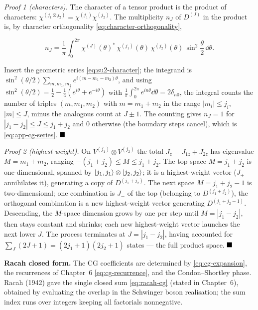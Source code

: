\medskip\noindent\textit{Proof 1 (characters).} The character of a tensor product is the product of characters: $\chi^{(j_{1}\otimes j_{2})}=\chi^{(j_{1})}\chi^{(j_{2})}$. The multiplicity $n_{J}$ of $D^{(J)}$ in the product is, by character orthogonality \eqref{eq:character-orthogonality},
\begin{linenomath}
\begin{equation*}
n_{J}=\frac1\pi\int_{0}^{2\pi}\chi^{(J)}(\theta)^{*}\,\chi^{(j_{1})}(\theta)\,\chi^{(j_{2})}(\theta)\,\sin^{2}\!\frac{\theta}{2}\,\dd\theta.
\end{equation*}
\end{linenomath}
Insert the geometric series \eqref{eq:su2-character}; the integrand is $\sin^{2}(\theta/2)\sum_{m,m_{1},m_{2}}e^{i(m-m_{1}-m_{2})\theta}$, and using $\sin^{2}(\theta/2)=\tfrac12-\tfrac14(e^{i\theta}+e^{-i\theta})$ with $\frac1\pi\int_{0}^{2\pi}e^{in\theta}\dd\theta=2\delta_{n0}$, the integral counts the number of triples $(m,m_{1},m_{2})$ with $m=m_{1}+m_{2}$ in the range $|m_{i}|\le j_{i}$, $|m|\le J$, minus the analogous count at $J\pm1$. The counting gives $n_{J}=1$ for $|j_{1}-j_{2}|\le J\le j_{1}+j_{2}$ and $0$ otherwise (the boundary steps cancel), which is \eqref{eq:app-cg-series}. $\hfill\blacksquare$

\medskip\noindent\textit{Proof 2 (highest weight).} On $V^{(j_{1})}\otimes V^{(j_{2})}$ the total $J_{z}=J_{1z}+J_{2z}$ has eigenvalue $M=m_{1}+m_{2}$, ranging $-(j_{1}+j_{2})\le M\le j_{1}+j_{2}$. The top space $M=j_{1}+j_{2}$ is one-dimensional, spanned by $\ket{j_{1},j_{1}}\otimes\ket{j_{2},j_{2}}$; it is a highest-weight vector ($J_{+}$ annihilates it), generating a copy of $D^{(j_{1}+j_{2})}$. The next space $M=j_{1}+j_{2}-1$ is two-dimensional; one combination is $J_{-}$ of the top (belonging to $D^{(j_{1}+j_{2})}$), the orthogonal combination is a new highest-weight vector generating $D^{(j_{1}+j_{2}-1)}$. Descending, the $M$-space dimension grows by one per step until $M=|j_{1}-j_{2}|$, then stays constant and shrinks; each new highest-weight vector launches the next lower $J$. The process terminates at $J=|j_{1}-j_{2}|$, having accounted for $\sum_{J}(2J+1)=(2j_{1}+1)(2j_{2}+1)$ states --- the full product space. $\hfill\blacksquare$

\medskip\noindent\textbf{Racah closed form.} The CG coefficients are determined by \eqref{eq:cg-expansion}, the recurrences of Chapter~6 \eqref{eq:cg-recurrence}, and the Condon--Shortley phase. Racah (1942) gave the single closed sum \eqref{eq:racah-cg} (stated in Chapter~6), obtained by evaluating the overlap in the Schwinger boson realisation; the sum index runs over integers keeping all factorials nonnegative.

